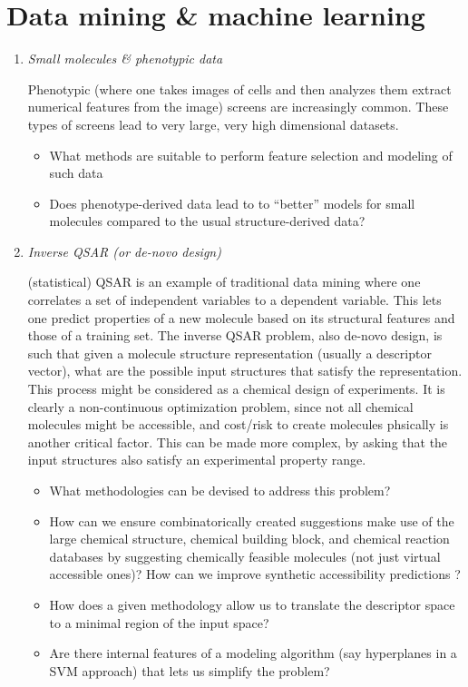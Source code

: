 \documentclass{sig-alternate}
\begin{document}
\section*{Data mining \& machine learning}
\begin{enumerate}


\item \emph{Small molecules \& phenotypic data}

Phenotypic (where one takes images of cells and then analyzes them
extract numerical features from the image) screens are increasingly
common. These types of screens lead to very large, very high
dimensional datasets.
\begin{itemize}
\item What methods are suitable to perform feature selection and
  modeling of such data
\item Does phenotype-derived data lead to to ``better'' models for
  small molecules compared to the usual structure-derived data?
\end{itemize}

\item \emph{Inverse QSAR (or de-novo design)}

(statistical) QSAR is an example of traditional data mining where one
correlates a set of independent variables to a dependent
variable. This lets one predict properties of a new molecule based on
its structural features and those of a training set. The inverse QSAR
problem, also de-novo design, is such that given a molecule structure representation
(usually a descriptor vector), what are the possible input structures
that satisfy the representation. This process might be considered as
a chemical design of experiments. It is clearly a non-continuous optimization problem, since
not all chemical molecules might be accessible, and cost/risk to create molecules phsically is another
critical factor. This can be made more complex, by
asking that the input structures also satisfy an experimental property
range.
\begin{itemize}
\item What methodologies can be devised to address this problem?
\item How can we ensure combinatorically created suggestions make use of the large 
chemical structure, chemical building block, and chemical reaction databases by suggesting
chemically feasible molecules (not just virtual accessible ones)? How can we improve 
synthetic accessibility predictions \cite{Boda_Seidel_Gasteiger_2007}?
\item How does a given methodology allow us to translate the
  descriptor space to a minimal region of the input space?
\item Are there internal features of a modeling algorithm (say
  hyperplanes in a SVM approach) that lets us simplify the problem?
\end{itemize}


\end{enumerate}
\end{document}
